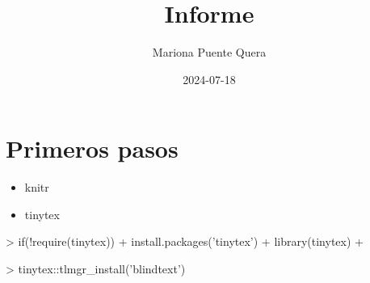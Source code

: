\documentclass{article}
\title{Informe}
\author{Mariona Puente Quera}
\date{2024-07-18}
\begin{document}

\section*{Primeros pasos}
\begin{itemize}
\item knitr
\item tinytex
\end{itemize}
\begin{Schunk}
\begin{Sinput}
> if(!require(tinytex)){
+   install.packages('tinytex')
+   library(tinytex)
+ }
\end{Sinput}
\end{Schunk}

\begin{Schunk}
\begin{Sinput}
> tinytex::tlmgr_install('blindtext')
\end{Sinput}
\end{Schunk}
\end{document}
